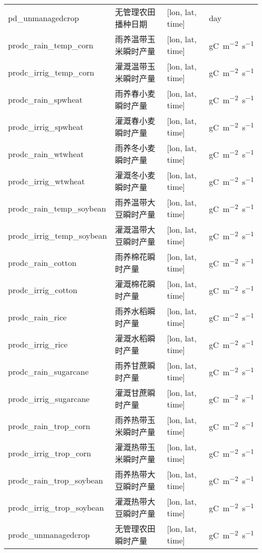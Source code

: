 \documentclass[a4paper,12pt,twoside]{article}
\begin{document}
{\begin{longtable}[htbp]{lp{}ll}
pd\_unmanagedcrop & 无管理农田播种日期 & {[}lon, lat, time{]} & \unit{day} \\
prodc\_rain\_temp\_corn & 雨养温带玉米瞬时产量 & {[}lon, lat, time{]} & \unit{gC.m^{-2}.s^{-1}} \\
prodc\_irrig\_temp\_corn & 灌溉温带玉米瞬时产量 & {[}lon, lat, time{]} & \unit{gC.m^{-2}.s^{-1}} \\
prodc\_rain\_spwheat & 雨养春小麦瞬时产量 & {[}lon, lat, time{]} & \unit{gC.m^{-2}.s^{-1}} \\
prodc\_irrig\_spwheat & 灌溉春小麦瞬时产量 & {[}lon, lat, time{]} & \unit{gC.m^{-2}.s^{-1}} \\
prodc\_rain\_wtwheat & 雨养冬小麦瞬时产量 & {[}lon, lat, time{]} & \unit{gC.m^{-2}.s^{-1}} \\
prodc\_irrig\_wtwheat & 灌溉冬小麦瞬时产量 & {[}lon, lat, time{]} & \unit{gC.m^{-2}.s^{-1}} \\
prodc\_rain\_temp\_soybean & 雨养温带大豆瞬时产量 & {[}lon, lat, time{]} & \unit{gC.m^{-2}.s^{-1}} \\
prodc\_irrig\_temp\_soybean & 灌溉温带大豆瞬时产量 & {[}lon, lat, time{]} & \unit{gC.m^{-2}.s^{-1}} \\
prodc\_rain\_cotton & 雨养棉花瞬时产量 & {[}lon, lat, time{]} & \unit{gC.m^{-2}.s^{-1}} \\
prodc\_irrig\_cotton & 灌溉棉花瞬时产量 & {[}lon, lat, time{]} & \unit{gC.m^{-2}.s^{-1}} \\
prodc\_rain\_rice & 雨养水稻瞬时产量 & {[}lon, lat, time{]} & \unit{gC.m^{-2}.s^{-1}} \\
prodc\_irrig\_rice & 灌溉水稻瞬时产量 & {[}lon, lat, time{]} & \unit{gC.m^{-2}.s^{-1}} \\
prodc\_rain\_sugarcane & 雨养甘蔗瞬时产量 & {[}lon, lat, time{]} & \unit{gC.m^{-2}.s^{-1}} \\
prodc\_irrig\_sugarcane & 灌溉甘蔗瞬时产量 & {[}lon, lat, time{]} & \unit{gC.m^{-2}.s^{-1}} \\
prodc\_rain\_trop\_corn & 雨养热带玉米瞬时产量 & {[}lon, lat, time{]} & \unit{gC.m^{-2}.s^{-1}} \\
prodc\_irrig\_trop\_corn & 灌溉热带玉米瞬时产量 & {[}lon, lat, time{]} & \unit{gC.m^{-2}.s^{-1}} \\
prodc\_rain\_trop\_soybean & 雨养热带大豆瞬时产量 & {[}lon, lat, time{]} & \unit{gC.m^{-2}.s^{-1}} \\
prodc\_irrig\_trop\_soybean & 灌溉热带大豆瞬时产量 & {[}lon, lat, time{]} & \unit{gC.m^{-2}.s^{-1}} \\
prodc\_unmanagedcrop & 无管理农田瞬时产量 & {[}lon, lat, time{]} & \unit{gC.m^{-2}.s^{-1}} \\
\end{longtable}}
\end{document}
